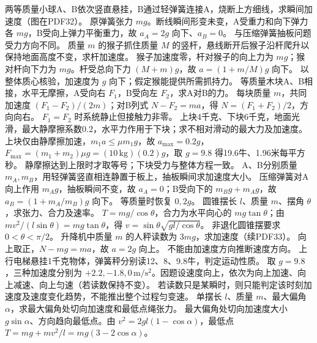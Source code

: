 \problemtext 两等质量小球A、B依次竖直悬挂，B通过轻弹簧连接A，烧断上方细线，求瞬间加速度（图在PDF32）。
\workings 原弹簧张力 $mg$。断线瞬间形变未变，A受重力和向下弹力各 $mg$，B受向上弹力平衡重力，故 $a_A=2g$ 向下、$a_B=0$。
\crosscheck 与压缩弹簧抽板问题受力方向不同。
\problemtext 质量 $m$ 的猴子抓住质量 $M$ 的竖杆，悬线断开后猴子沿杆爬升以保持地面高度不变，求杆加速度。
\workings 猴子加速度零，杆对猴子的向上力为 $mg$；猴对杆向下力为 $mg$。杆受总向下力 $(M+m)g$，故 $a=(1+m/M)g$ 向下。
\crosscheck 以整体质心核验，加速度为 $g$ 向下；假定猴能提供所需抓持力。
\problemtext 等质量木块A、B相接，水平无摩擦，A受向右 $F_1$，B受向左 $F_2$，求A对B的力。
\workings 每块质量 $m$，共同加速度 $(F_1-F_2)/(2m)$；对B列式 $N-F_2=ma$，得 $N=(F_1+F_2)/2$，方向向右。
\crosscheck $F_1=F_2$ 时系统静止但接触力非零。
\problemtext 上块4千克、下块6千克，地面光滑，最大静摩擦系数0.2，水平力作用于下块；求不相对滑动的最大力及加速度。
\workings 上块仅由静摩擦加速，$m_1a\le\mu m_1g$，故 $a_{\max}=0.2g$，$F_{\max}=(m_1+m_2)\mu g=(10\,\mathrm{kg})(0.2)g$，取 $g=9.8$ 得19.6牛、1.96米每平方秒。
\crosscheck 静摩擦达到上限时才取等号；下块受力与整体方程一致。
\problemtext A、B分别质量 $m_A,m_B$，用轻弹簧竖直相连静置于板上，抽板瞬间求加速度大小。
\workings 压缩弹簧对A向上作用 $m_Ag$，抽板瞬间不变，故 $a_A=0$；B受向下的 $m_Bg+m_Ag$，故 $a_B=(1+m_A/m_B)g$ 向下。
\crosscheck 等质量时恢复 $0,2g$。
\problemtext 圆锥摆长 $l$、质量 $m$、摆角 $\theta$，求张力、合力及速率。
\workings $T=mg/\cos\theta$，合力为水平向心的 $mg\tan\theta$；由 $mv^2/(l\sin\theta)=mg\tan\theta$，得 $v=\sin\theta\sqrt{gl/\cos\theta}$。
\crosscheck 非退化圆锥摆要求 $0<\theta<\pi/2$。
\problemtext 升降机中质量 $m$ 的人秤读数为 $3mg$，求加速度（续PDF33）。
\workings 向上取正，$N-mg=ma$，故 $a=2g$ 向上。
\crosscheck 不能由加速度方向推断速度方向。
\problemtext 上行电梯悬挂1千克物体，弹簧秤分别读12、8、9.8牛，判定运动性质。
\workings 取 $g=9.8$，三种加速度分别为 $+2.2,-1.8,0\,\mathrm{m/s^2}$。因题设速度向上，依次为向上加速、向上减速、向上匀速（若读数保持不变）。
\crosscheck 若读数只是某瞬时，则只能判定该时刻加速度及速度变化趋势，不能推出整个过程匀变速。
\problemtext 单摆长 $l$、质量 $m$、最大偏角 $\alpha$，求最大偏角处切向加速度和最低点绳张力。
\workings 最大偏角处切向加速度大小 $g\sin\alpha$、方向趋向最低点。由 $v^2=2gl(1-\cos\alpha)$，最低点 $T=mg+mv^2/l=mg(3-2\cos\alpha)$。
